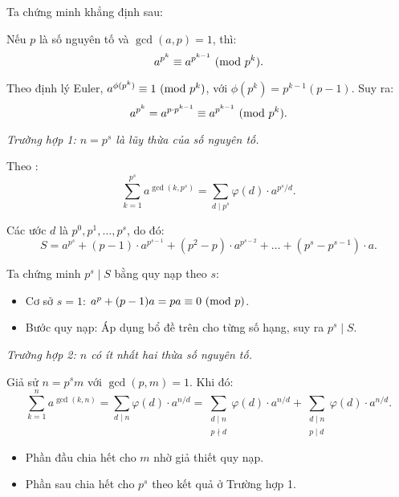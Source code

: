 \documentclass[../03-arithmetic-functions.tex]{subfiles}
\begin{document}
\begin{soln}

    Ta chứng minh khẳng định sau:

    \begin{claim*}
        Nếu \( p \) là số nguyên tố và \( \gcd(a,p) = 1 \), thì:
        \[
            a^{p^k} \equiv a^{p^{k-1}} \ (\mathrm{mod}\ p^k).
        \]
    \end{claim*}

    \begin{subproof}
        Theo định lý Euler, \( a^{\phi(p^k)} \equiv 1 \ (\mathrm{mod}\ p^k) \), với \( \phi(p^k) = p^{k-1}(p - 1) \).  
        Suy ra:
        \[
            a^{p^k} = a^{p \cdot p^{k-1}} \equiv a^{p^{k-1}} \ (\mathrm{mod}\ p^k).
        \]
    \end{subproof}

    \textit{Trường hợp 1: \( n = p^s \) là lũy thừa của số nguyên tố.}  

    Theo :
    \[
        \sum_{k = 1}^{p^s} a^{\gcd(k, p^s)} = \sum_{d \mid p^s} \varphi(d) \cdot a^{p^s/d}.
    \]

    Các ước \( d \) là \( p^0, p^1, \ldots, p^s \), do đó:
    \[
        S = a^{p^s} + (p - 1) \cdot a^{p^{s - 1}} + (p^2 - p) \cdot a^{p^{s - 2}} + \dots + (p^s - p^{s - 1}) \cdot a.
    \]

    Ta chứng minh \( p^s \mid S \) bằng quy nạp theo \( s \):
    \begin{itemize}[topsep=0pt, itemsep=0pt]
        \item Cơ sở \( s = 1 \): \( a^p + (p - 1)a = pa \equiv 0 \ (\mathrm{mod}\ p) \).
        \item Bước quy nạp: Áp dụng bổ đề trên cho từng số hạng, suy ra \( p^s \mid S \).
    \end{itemize}

    \textit{Trường hợp 2: \( n \) có ít nhất hai thừa số nguyên tố.}  

    Giả sử \( n = p^s m \) với \( \gcd(p, m) = 1 \). Khi đó:
    \[
        \sum_{k=1}^{n} a^{\gcd(k,n)} = \sum_{d \mid n} \varphi(d) \cdot a^{n/d}
        = \sum_{\substack{d \mid n \\ p \nmid d}} \varphi(d) \cdot a^{n/d}
        + \sum_{\substack{d \mid n \\ p \mid d}} \varphi(d) \cdot a^{n/d}.
    \]

    \begin{itemize}[topsep=0pt, itemsep=0pt]
        \item Phần đầu chia hết cho \( m \) nhờ giả thiết quy nạp.
        \item Phần sau chia hết cho \( p^s \) theo kết quả ở Trường hợp 1.
    \end{itemize}


\end{soln}
\end{document}
